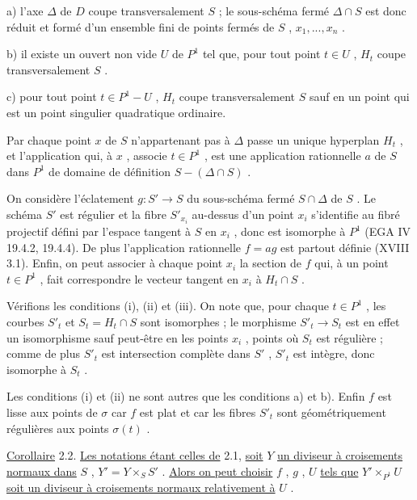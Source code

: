 a) l'axe  $\Delta$  de  $D$  coupe transversalement  $S$ ; le sous-schéma fermé  $\Delta \cap S$  est donc réduit et formé d'un ensemble fini de points fermés de  $S$ , $x_1,...,x_n$ .

b) il existe un ouvert non vide  $U$  de  $P^1$  tel que, pour tout point  $t \in U$ , $H_t$  coupe transversalement  $S$ .

c) pour tout point  $t \in P^1-U$ , $H_t$  coupe transversalement  $S$  sauf en un point qui est un point singulier quadratique ordinaire.

Par chaque point  $x$  de  $S$  n'appartenant pas à  $\Delta$  passe un unique hyperplan  $H_t$ , et l'application qui, à  $x$ , associe  $t \in P^1$ , est une application rationnelle  $a$  de  $S$  dans  $P^1$  de domaine de définition  $S-(\Delta \cap S)$ .

On considère l'éclatement  $g : S' \longrightarrow S$  du sous-schéma fermé  $S \cap \Delta$  de  $S$ . Le schéma  $S'$  est régulier et la fibre  $S'_{x_i}$  au-dessus d'un point  $x_i$  s'identifie au fibré projectif défini par l'espace tangent à  $S$  en  $x_i$ , donc est isomorphe à  $P^1$  (EGA IV 19.4.2, 19.4.4). De plus l'application rationnelle  $f = ag$  est partout définie (XVIII 3.1). Enfin, on peut associer à chaque point  $x_i$  la section de  $f$  qui, à un point  $t \in P^1$ , fait correspondre le vecteur tangent en  $x_i$  à  $H_t \cap S$ .

Vérifions les conditions (i), (ii) et (iii). On note que, pour chaque  $t \in P^1$ , les courbes  $S'_t$  et  $S_t = H_t \cap S$  sont isomorphes ; le morphisme  $S'_t \longrightarrow S_t$  est en effet un isomorphisme sauf peut-être en les points  $x_i$ , points où  $S_t$  est régulière ; comme de plus  $S'_t$  est intersection complète dans  $S'$ , $S'_t$  est intègre, donc isomorphe à  $S_t$ .

Les conditions (i) et (ii) ne sont autres que les conditions a) et b). Enfin  $f$  est lisse aux points de  $\sigma$  car  $f$  est plat et car les fibres  $S'_t$  sont géométriquement régulières aux points  $\sigma(t)$ .



\underline{Corollaire} 2.2. \underline{Les notations étant celles de} 2.1, \underline{soit} $Y$ \underline{un diviseur à croisements normaux dans} $S$ , $Y' = Y \times_S S'$ . \underline{Alors on peut choisir} $f$ , $g$ , $U$ \underline{tels que} $Y'\times_{P^1}U$ \underline{soit un diviseur à croisements normaux relativement à} $U$ .

